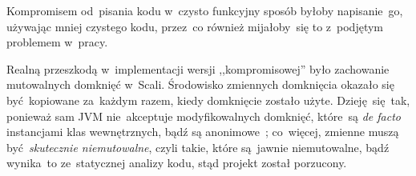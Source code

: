 \documentclass[../../thesis.tex]{subfiles}
\begin{document}
Kompromisem od~pisania kodu w~czysto funkcyjny sposób byłoby napisanie~go, używając
mniej czystego kodu, przez~co również mijałoby~się to z~podjętym problemem w~pracy.

Realną przeszkodą w~implementacji wersji ,,kompromisowej'' było zachowanie mutowalnych
domknięć w~Scali. Środowisko zmiennych domknięcia okazało się być~kopiowane za~każdym razem, kiedy
domknięcie zostało użyte. Dzieję~się~tak, ponieważ sam JVM nie~akceptuje modyfikowalnych
domknięć, które~są \emph{de facto} instancjami klas wewnętrznych, bądź są anonimowe~\cite{Oracle:IC}; co~więcej, 
zmienne muszą być~\emph{skutecznie niemutowalne}, czyli takie, które są~jawnie 
niemutowalne, bądź wynika~to ze~statycznej analizy kodu, stąd projekt został porzucony.
\end{document}
